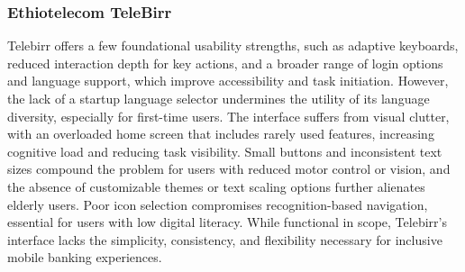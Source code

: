 \documentclass[a4paper,12pt]{report}
\begin{document}
\subsubsection{Ethiotelecom TeleBirr}
Telebirr offers a few foundational usability strengths, such as adaptive keyboards, reduced interaction depth for key actions, and a broader range of login options and language support, which improve accessibility and task initiation. However, the lack of a startup language selector undermines the utility of its language diversity, especially for first-time users. The interface suffers from visual clutter, with an overloaded home screen that includes rarely used features, increasing cognitive load and reducing task visibility. Small buttons and inconsistent text sizes compound the problem for users with reduced motor control or vision, and the absence of customizable themes or text scaling options further alienates elderly users. Poor icon selection compromises recognition-based navigation, essential for users with low digital literacy. While functional in scope, Telebirr’s interface lacks the simplicity, consistency, and flexibility necessary for inclusive mobile banking experiences.
\end{document}
